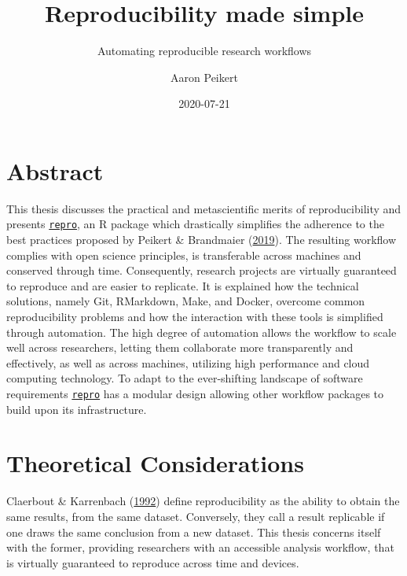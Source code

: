 \documentclass[12pt,a4paper,]{article}
\title{Reproducibility made simple}
\subtitle{Automating reproducible research workflows}
\author{Aaron Peikert}
\date{2020-07-21}
\begin{document}
\maketitle

{
\setcounter{tocdepth}{2}
\tableofcontents
}
\hypertarget{abstract}{%
\section*{Abstract}\label{abstract}}

This thesis discusses the practical and metascientific merits of reproducibility and presents \href{https://github.com/aaronpeikert/repro}{\texttt{repro}}, an R package which drastically simplifies the adherence to the best practices proposed by Peikert \& Brandmaier (\protect\hyperlink{ref-peikertReproducibleDataAnalysis2019}{2019}).
The resulting workflow complies with open science principles, is transferable across machines and conserved through time.
Consequently, research projects are virtually guaranteed to reproduce and are easier to replicate.
It is explained how the technical solutions, namely Git, RMarkdown, Make, and Docker, overcome common reproducibility problems and how the interaction with these tools is simplified through automation.
The high degree of automation allows the workflow to scale well across researchers, letting them collaborate more transparently and effectively, as well as across machines, utilizing high performance and cloud computing technology.
To adapt to the ever-shifting landscape of software requirements \href{https://github.com/aaronpeikert/repro}{\texttt{repro}} has a modular design allowing other workflow packages to build upon its infrastructure.

\hypertarget{theoretical-considerations}{%
\section{Theoretical Considerations}\label{theoretical-considerations}}

Claerbout \& Karrenbach (\protect\hyperlink{ref-claerboutElectronicDocumentsGive1992}{1992}) define reproducibility as the ability to obtain the same results, from the same dataset.
Conversely, they call a result replicable if one draws the same conclusion from a new dataset.
This thesis concerns itself with the former, providing researchers with an accessible analysis workflow, that is virtually guaranteed to reproduce across time and devices.
\end{document}
